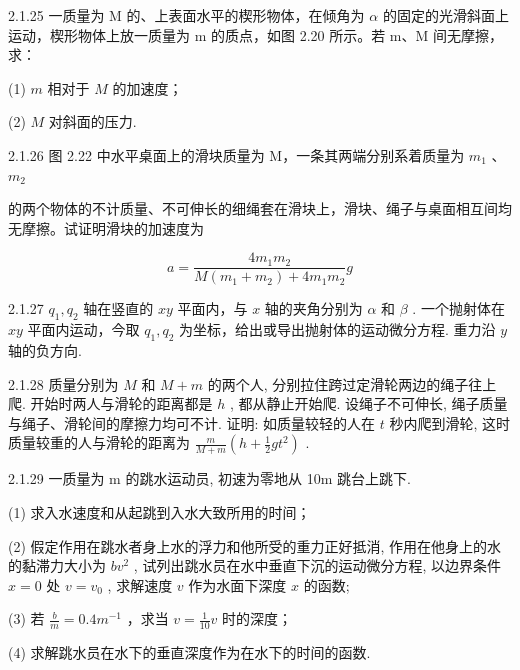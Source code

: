 \begin{problem}{2.1.25}
一质量为 M 的、上表面水平的楔形物体，在倾角为 $\alpha$ 的固定的光滑斜面上运动，楔形物体上放一质量为 m 的质点，如图 2.20 所示。若 m、M 间无摩擦，求：

(1) $m$ 相对于 $M$ 的加速度；

(2) $M$ 对斜面的压力.
\begin{center}

\end{center}
\end{problem}
\clearpage


\begin{problem}{2.1.26}
图 2.22 中水平桌面上的滑块质量为 M，一条其两端分别系着质量为 $m_{1}$ 、 $m_{2}$ 

的两个物体的不计质量、不可伸长的细绳套在滑块上，滑块、绳子与桌面相互间均无摩擦。试证明滑块的加速度为

\[
a = \frac {4 m _ {1} m _ {2}}{M (m _ {1} + m _ {2}) + 4 m _ {1} m _ {2}} g
\]
\begin{center}

\end{center}
\end{problem}
\clearpage


\begin{problem}{2.1.27}
$q_{1}, q_{2}$ 轴在竖直的 $xy$ 平面内，与 $x$ 轴的夹角分别为 $\alpha$ 和 $\beta$ . 一个抛射体在 $xy$ 平面内运动，今取 $q_{1}, q_{2}$ 为坐标，给出或导出抛射体的运动微分方程. 重力沿 $y$ 轴的负方向.
\end{problem}
\clearpage


\begin{problem}{2.1.28}
质量分别为 $M$ 和 $M + m$ 的两个人, 分别拉住跨过定滑轮两边的绳子往上爬. 开始时两人与滑轮的距离都是 $h$ , 都从静止开始爬. 设绳子不可伸长, 绳子质量与绳子、滑轮间的摩擦力均可不计. 证明: 如质量较轻的人在 $t$ 秒内爬到滑轮, 这时质量较重的人与滑轮的距离为 $\frac{m}{M + m}\left(h + \frac{1}{2} gt^2\right)$ .
\end{problem}
\clearpage


\begin{problem}{2.1.29}
一质量为 m 的跳水运动员, 初速为零地从 10m 跳台上跳下.

(1) 求入水速度和从起跳到入水大致所用的时间；

(2) 假定作用在跳水者身上水的浮力和他所受的重力正好抵消, 作用在他身上的水的黏滞力大小为 $bv^2$ , 试列出跳水员在水中垂直下沉的运动微分方程, 以边界条件 $x = 0$ 处 $v = v_0$ , 求解速度 $v$ 作为水面下深度 $x$ 的函数;

(3) 若 $\frac{b}{m}=0.4m^{-1}$ ，求当 $v=\frac{1}{10}v$ 时的深度；

(4) 求解跳水员在水下的垂直深度作为在水下的时间的函数.
\end{problem}
\clearpage


